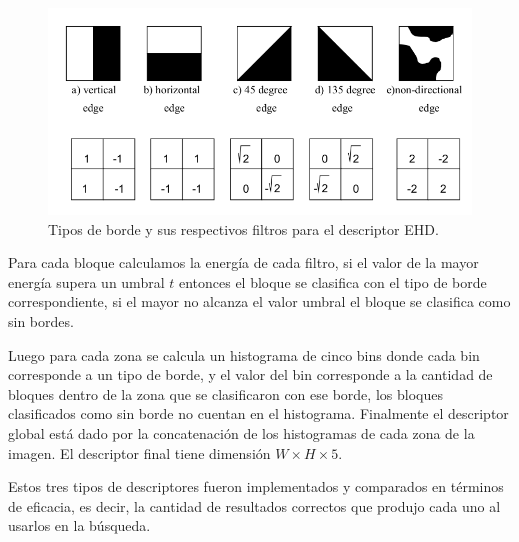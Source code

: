     \begin{figure}[!h]
		\centering
		\includegraphics[scale=0.45]{imagenes/cap3/ehd_filters.png}
		\caption{Tipos de borde y sus respectivos filtros para el descriptor EHD.}
		\label{ehd_filters}
	\end{figure}
Para cada bloque calculamos la energía de cada filtro, si el valor de la mayor energía supera un umbral $t$ entonces el bloque se clasifica con el tipo de borde correspondiente, si el mayor no alcanza el valor umbral el bloque se clasifica como sin bordes.

Luego para cada zona se calcula un histograma de cinco bins donde cada bin corresponde a un tipo de borde, y el valor del bin corresponde a la cantidad de bloques dentro de la zona que se clasificaron con ese borde, los bloques clasificados como sin borde no cuentan en el histograma.
Finalmente el descriptor global está dado por la concatenación de los histogramas de cada zona de la imagen. El descriptor final tiene dimensión 
$W \times H \times 5$.

Estos tres tipos de descriptores fueron implementados y comparados en términos de eficacia, es decir, la cantidad de resultados correctos que produjo cada uno al usarlos en la búsqueda. 
